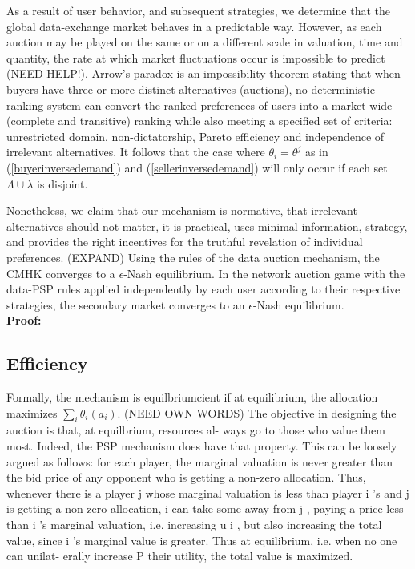 \documentclass[sigconf, anonymous]{acmart}
\theoremstyle{definition}
\begin{document}
{
}

As a result of user behavior, and subsequent strategies, we determine that the
global data-exchange market behaves in a predictable way. However, as
each auction may be played on the same or on a different scale in
valuation, time and quantity, the rate at which market fluctuations occur is
impossible to predict (NEED HELP!). 
Arrow's paradox is an impossibility theorem stating that when buyers have three
or more distinct alternatives (auctions), no deterministic ranking system can
convert the ranked preferences of users into a market-wide (complete
and transitive) ranking while also meeting a specified set of criteria:
unrestricted domain, non-dictatorship, Pareto efficiency and independence of
irrelevant alternatives. It follows that the case where
$\theta_i = \theta^j$ as in (\ref{buyerinversedemand}) and
(\ref{sellerinversedemand}) will only occur if each set $\Lambda \cup \lambda$
is disjoint.

Nonetheless, we claim that our mechanism is normative, that irrelevant
alternatives should not matter, it is practical, uses minimal information,
strategy, and provides the right incentives for the truthful revelation of individual preferences. 
(EXPAND)
{
Using the rules of the data auction mechanism, the CMHK
\cite{zheng} converges to a $\epsilon$-Nash equilibrium. In the network auction
game with the data-PSP rules applied independently by each user according to their respective strategies, the secondary market converges to an $\epsilon$-Nash
equilibrium. 
}\\
\textbf{Proof:}


\subsection{Efficiency}

Formally, the
mechanism is equilbriumcient if at equilibrium, the allocation maximizes
$\sum_i\theta_i(a_i)$.
(NEED OWN WORDS)
The objective in designing the auction is that, at equilbrium, resources al-
ways go to those who value them most. Indeed, the PSP mechanism does
have that property. This can be loosely argued as follows: for each player,
the marginal valuation is never greater than the bid price of any opponent
who is getting a non-zero allocation. Thus, whenever there is a player j
whose marginal valuation is less than player i 's and j is getting a non-zero
allocation, i can take some away from j , paying a price less than i 's marginal
valuation, i.e. increasing u i , but also increasing the total value, since i 's
marginal value is greater. Thus at equilibrium, i.e. when no one can unilat-
erally increase P their utility, the total value is maximized.
\end{document}
